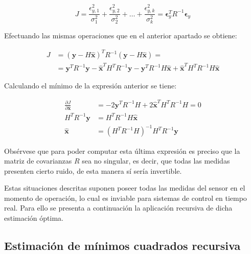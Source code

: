 \begin{equation}
J = \frac{\epsilon_{y,1}^2}{\sigma_1^2} + \frac{\epsilon_{y,2}^2}{\sigma_2^2} + \ldots + \frac{\epsilon_{y,k}^2}{\sigma_k^2} = \boldsymbol{\epsilon}_y^T R^{-1} \boldsymbol{\epsilon}_y
\label{eq:ponderacion}
\end{equation}

\noindent
Efectuando las mismas operaciones que en el anterior apartado se obtiene: 

\begin{equation}
\begin{split}
	J &= (\boldsymbol{y} - H\boldsymbol{\hat{x}})^T R^{-1} (\boldsymbol{y} - H\boldsymbol{\hat{x}}) = \\
	&= \boldsymbol{y}^T R^{-1} \boldsymbol{y} - \boldsymbol{\hat{x}}^T H^T R^{-1} \boldsymbol{y} - \boldsymbol{y}^T R^{-1} H\boldsymbol{\hat{x}} + \boldsymbol{\hat{x}}^T H^T R^{-1} H\boldsymbol{\hat{x}}
\end{split}
\end{equation}

\noindent
Calculando el mínimo de la expresión anterior se tiene:

\begin{equation}
\begin{split}
	\frac{\partial J}{\partial \boldsymbol{\hat{x}}} &= -2 \boldsymbol{y}^T R^{-1} H + 2 \boldsymbol{\hat{x}}^T H^T R^{-1} H = 0 \\
	H^T R^{-1} \boldsymbol{y} &= H^T R^{-1} H \boldsymbol{\hat{x}} \\
	\boldsymbol{\hat{x}} &= (H^T R^{-1} H)^{-1} H^T R^{-1} \boldsymbol{y}
\end{split}
\label{eq:estponderado}
\end{equation}

Obsérvese que para poder computar esta última expresión es preciso que la matriz de covarianzas $R$ sea no singular, es decir, que todas las medidas presenten cierto ruido, de esta manera sí sería invertible. \par 

Estas situaciones descritas suponen poseer todas las medidas del sensor en el momento de operación, lo cual es inviable para sistemas de control en tiempo real. Para ello se presenta a continuación la aplicación recursiva de dicha estimación óptima. \par 

\subsection{Estimación de mínimos cuadrados recursiva}

